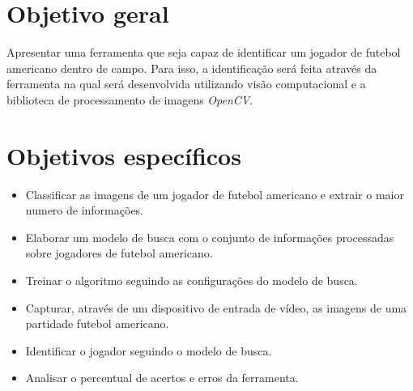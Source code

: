 \section{\textbf{{Objetivo geral}}}
\label{objetivo-geral}
Apresentar uma ferramenta que seja capaz de identificar um jogador de futebol americano dentro de campo. Para isso, a identificação será feita através da ferramenta na qual será desenvolvida utilizando visão computacional e a biblioteca de processamento de imagens \textit{OpenCV}. 


\section{\textbf{{Objetivos específicos}}}
 \begin{itemize}
\item Classificar as imagens de um jogador de futebol americano e extrair o maior numero de informações.

\item Elaborar um modelo de busca com o conjunto de informações processadas sobre jogadores de futebol americano.

\item Treinar o algoritmo seguindo as configurações do modelo de busca.
   
\item Capturar, através de um dispositivo de entrada de vídeo, as imagens de uma partidade futebol americano.
   
\item Identificar o jogador seguindo o modelo de busca.
   
\item Analisar o percentual de acertos e erros da ferramenta.
   
 \end{itemize}